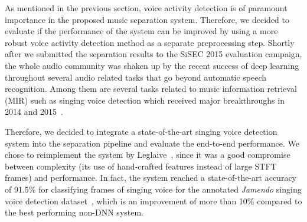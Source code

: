 As mentioned in the previous section, voice activity detection is of paramount importance in the proposed music separation system.
Therefore, we decided to evaluate if the performance of the system can be improved by using a more robust voice activity detection method as a separate preprocessing step.
Shortly after we submitted the separation results to the SiSEC 2015 evaluation campaign, the whole audio community was shaken up by the recent success of deep learning throughout several audio related tasks that go beyond automatic speech recognition.
Among them are several tasks related to music information retrieval (MIR) such as singing voice detection which received major breakthroughs in 2014 and 2015~\cite{lehner14, lehner15, Leglaive15, schlueter15}.
\par
Therefore, we decided to integrate a state-of-the-art singing voice detection system into the separation pipeline and evaluate the end-to-end performance.
We chose to reimplement the system by Leglaive~\cite{Leglaive15}, since it was a good compromise between complexity (its use of hand-crafted features instead of large STFT frames) and performance.
In fact, the system reached a state-of-the-art accuracy of 91.5\% for classifying frames of singing voice for the annotated \emph{Jamendo} singing voice detection dataset~\cite{ramona08}, which is an improvement of more than 10\% compared to the best performing non-DNN system.
